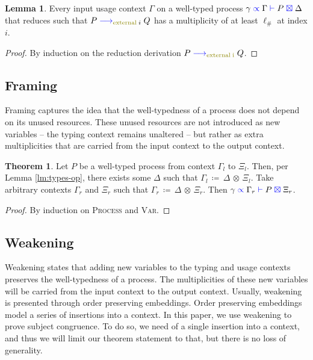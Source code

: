\documentclass[a4paper,UKenglish,cleveref, autoref, thm-restate,authorcolumns]{lipics-v2019}
\theoremstyle{definition}
\newtheorem{nitheorem}[theorem]{Theorem}
\newtheorem{nilemma}[theorem]{Lemma}
\newcommand{\type}[1]{\textcolor{blue}{\operatorname{#1}}}
\newcommand{\constr}[1]{\textcolor{olive}{\operatorname{#1}}}
\newcommand{\opctx}[3]{#1 \, \coloneqq \, #2 \, \otimes \, #3}
\newcommand{\reduce}[1]{\; \type{\longrightarrow}_{#1} \;}
\newcommand{\types}[4]{#1 \; \type{\propto} \; #2 \; \type{\vdash} \; #3 \; \type{\boxtimes} \; #4}
\begin{document}
\begin{nilemma}
  \label{lm:comm-capable}
  Every input usage context $\Gamma$ on a well-typed process $\types{\gamma}{\Gamma}{P}{\Delta}$ that reduces such that $P \reduce{\constr{external} \; i} Q$ has a multiplicity of at least $\ell_\#$ at index $i$.
\end{nilemma}
\begin{proof}
  By induction on the reduction derivation $P \reduce{\constr{external \; i}}Q$.
\end{proof}

\subsection{Framing}

Framing captures the idea that the well-typedness of a process does not depend on its unused resources.
These unused resources are not introduced as new variables -- the typing context remains unaltered -- but rather as extra multiplicities that are carried from the input context to the output context.

\begin{nitheorem}
  \label{thm:framing}
  Let $P$ be a well-typed process from context $\Gamma_l$ to $\Xi_l$.
  Then, per Lemma \ref{lm:types-op}, there exists some $\Delta$ such that $\opctx{\Gamma_l}{\Delta}{\Xi_l}$.
  Take arbitrary contexts $\Gamma_r$ and $\Xi_r$ such that $\opctx{\Gamma_r}{\Delta}{\Xi_r}$.
  Then $\types{\gamma}{\Gamma_r}{P}{\Xi_r}$.
\end{nitheorem}
\begin{proof}
  By induction on \textsc{Process} and \textsc{Var}.
\end{proof}

\subsection{Weakening}

Weakening states that adding new variables to the typing and usage contexts preserves the well-typedness of a process.
The multiplicities of these new variables will be carried from the input context to the output context.
Usually, weakening is presented through order preserving embeddings.
Order preserving embeddings model a series of insertions into a context.
In this paper, we use weakening to prove subject congruence.
To do so, we need of a single insertion into a context, and thus we will limit our theorem statement to that, but there is no loss of generality.
\end{document}

